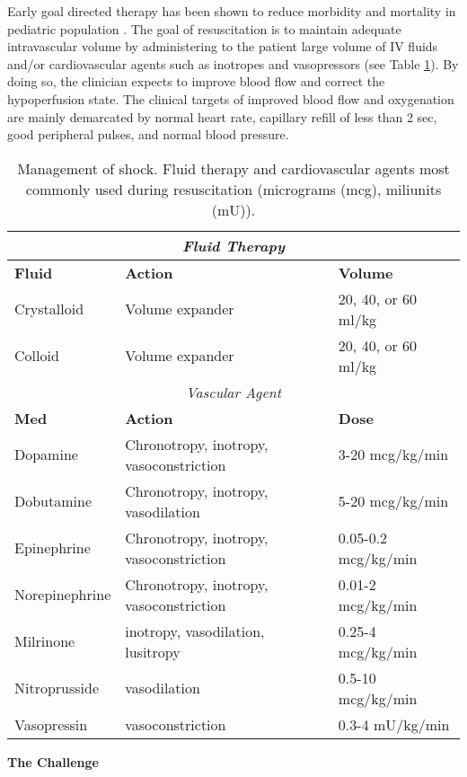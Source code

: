 \documentclass[
   technote
]{phildoc}
\newcommand{\tab}{Table}
\begin{document}
Early goal directed therapy has been shown to reduce morbidity and mortality in pediatric population \cite{Rivers:2008a}. The goal of resuscitation is to maintain adequate intravascular volume by administering to the patient large volume of IV fluids and/or cardiovascular agents such as inotropes and vasopressors (see \tab{} \ref{tab:management_shock}). By doing so, the clinician expects to improve blood flow and correct the hypoperfusion state. The clinical targets of improved blood flow and oxygenation are mainly demarcated by normal heart rate, capillary refill of less than 2 sec, good peripheral pulses, and normal blood pressure.

    
\begin{table}[h!]
\centering
\caption{Management of shock. Fluid therapy and cardiovascular agents most commonly used during resuscitation (micrograms (mcg), miliunits (mU)).}
\label{tab:management_shock}       
\begin{tabular}{|l|l|l|}
\hline
\multicolumn{3}{|c|}{\textit{Fluid Therapy}} \\
\hline
\textbf{Fluid} & \textbf{Action} & \textbf{Volume} \\
\hline
Crystalloid & Volume expander & 20, 40, or 60 ml/kg \\
\hline
Colloid & Volume expander & 20, 40, or 60 ml/kg \\
\hline
\multicolumn{3}{|c|}{\textit{Vascular Agent}}\\
\hline
\textbf{Med} & \textbf{Action} & \textbf{Dose}\\
\hline
Dopamine & Chronotropy, inotropy, vasoconstriction & 3-20 mcg/kg/min \\
\hline
Dobutamine & Chronotropy, inotropy, vasodilation & 5-20 mcg/kg/min\\
\hline
Epinephrine & Chronotropy, inotropy, vasoconstriction & 0.05-0.2 mcg/kg/min\\
\hline
Norepinephrine & Chronotropy, inotropy, vasoconstriction & 0.01-2 mcg/kg/min \\
\hline
Milrinone & inotropy, vasodilation, lusitropy & 0.25-4 mcg/kg/min\\
\hline
Nitroprusside & vasodilation & 0.5-10 mcg/kg/min \\
\hline
Vasopressin & vasoconstriction & 0.3-4 mU/kg/min \\
\hline
\end{tabular}
\end{table}

\noindent\textbf{The Challenge}
\end{document}
